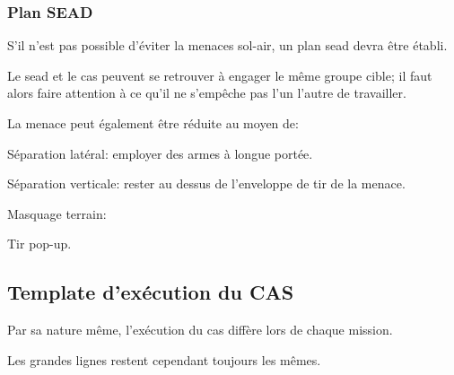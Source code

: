 \subsubsection{Plan SEAD}%

\begin{e1}
	
	\item S'il n'est pas possible d'éviter la menaces sol-air, un plan \gls{sead} devra être établi.
	
	\item Le \gls{sead} et le \gls{cas} peuvent se retrouver à engager le même groupe cible; il faut alors faire attention à ce qu'il ne s'empêche pas l'un l'autre de travailler.
	
	\item La menace peut également être réduite au moyen de:
	
	\begin{e2}
		
		\item Séparation latéral: employer des armes à longue portée.
		
		\item Séparation verticale: rester au dessus de l'enveloppe de tir de la menace.
		
		\item Masquage terrain:
		
		\begin{e3}
			
			\item Tir pop-up.
			
			
		\end{e3}
		
	\end{e2}
	
\end{e1}

\subsection{Template d'exécution du CAS}%

Par sa nature même, l'exécution du \gls{cas} diffère lors de chaque mission.

Les grandes lignes restent cependant toujours les mêmes.

